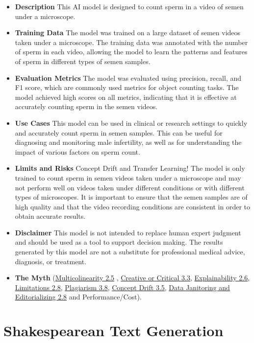 \begin{itemize}
\item \textbf{Description} This AI model is designed to count sperm in a video of semen under a microscope.
\item \textbf{Training Data} The model was trained on a large dataset of semen videos taken under a microscope. The training data was annotated with the number of sperm in each video, allowing the model to learn the patterns and features of sperm in different types of semen samples.
\item \textbf{Evaluation Metrics} The model was evaluated using precision, recall, and F1 score, which are commonly used metrics for object counting tasks. The model achieved high scores on all metrics, indicating that it is effective at accurately counting sperm in the semen videos.
\item \textbf{Use Cases} This model can be used in clinical or research settings to quickly and accurately count sperm in semen samples. This can be useful for diagnosing and monitoring male infertility, as well as for understanding the impact of various factors on sperm count.
\item \textbf{Limits and Risks} Concept Drift and Transfer Learning! The model is only trained to count sperm in semen videos taken under a microscope and may not perform well on videos taken under different conditions or with different types of microscopes. It is important to ensure that the semen samples are of high quality and that the video recording conditions are consistent in order to obtain accurate results.
\item \textbf{Disclaimer} This model is not intended to replace human expert judgment and should be used as a tool to support decision making. The results generated by this model are not a substitute for professional medical advice, diagnosis, or treatment.
\item \textbf{The Myth} (\hyperref[sec:multi]{Multicolinearity 2.5} , \hyperref[sec:creative]{Creative or Critical 3.3}, \hyperref[sec:explain]{Explainability 2.6}, \hyperref[sec:limits]{Limitations 2.8}, \hyperref[sec:plag]{Plagiarism 3.8}, \hyperref[sec:drift]{Concept Drift 3.5}, \hyperref[sec:janitor]{Data Janitoring and Editorializing 2.8} and Performance/Cost).
\end{itemize}

\section{Shakespearean Text Generation } 
